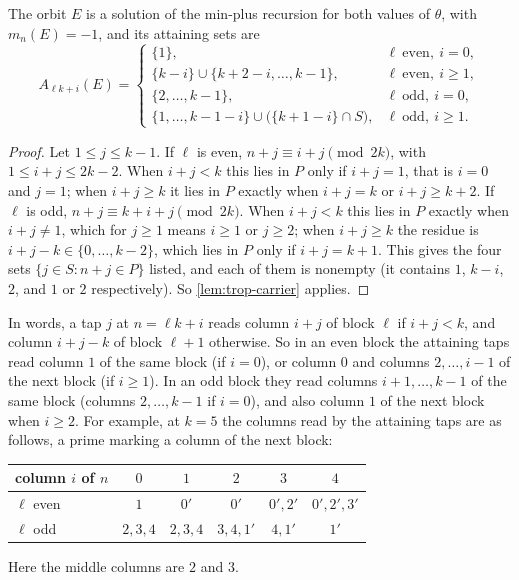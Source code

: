 \begin{lemma}
\label{lem:fs-carrier}
The orbit $E$ is a solution of the min-plus recursion for both values of $\theta$,
with $m_n(E)=-1$, and its attaining sets are
\[
A_{\ell k+i}(E)=\begin{cases}
\{1\}, & \ell\ \text{even},\ i=0,\\
\{k-i\}\cup\{k+2-i,\dots,k-1\}, & \ell\ \text{even},\ i\ge1,\\
\{2,\dots,k-1\}, & \ell\ \text{odd},\ i=0,\\
\{1,\dots,k-1-i\}\cup\bigl(\{k+1-i\}\cap S\bigr), & \ell\ \text{odd},\ i\ge1.
\end{cases}
\]
\end{lemma}

\begin{proof}
Let $1\le j\le k-1$. If $\ell$ is even, $n+j\equiv i+j\pmod{2k}$, with
$1\le i+j\le2k-2$. When $i+j<k$ this lies in $P$ only if $i+j=1$, that is $i=0$
and $j=1$; when $i+j\ge k$ it lies in $P$ exactly when $i+j=k$ or $i+j\ge k+2$.
If $\ell$ is odd, $n+j\equiv k+i+j\pmod{2k}$. When $i+j<k$ this lies in $P$
exactly when $i+j\ne1$, which for $j\ge1$ means $i\ge1$ or $j\ge2$; when $i+j\ge k$
the residue is $i+j-k\in\{0,\dots,k-2\}$, which lies in $P$ only if $i+j=k+1$.
This gives the four sets $\{j\in S:n+j\in P\}$ listed, and each of them is nonempty
(it contains $1$, $k-i$, $2$, and $1$ or $2$ respectively). So
\autoref{lem:trop-carrier} applies.
\end{proof}

In words, a tap $j$ at $n=\ell k+i$ reads column $i+j$ of block $\ell$ if
$i+j<k$, and column $i+j-k$ of block $\ell+1$ otherwise. So in an even block the
attaining taps read column $1$ of the same block (if $i=0$), or column $0$ and
columns $2,\dots,i-1$ of the next block (if $i\ge1$). In an odd block they read
columns $i+1,\dots,k-1$ of the same block (columns $2,\dots,k-1$ if $i=0$), and
also column $1$ of the next block when $i\ge2$. For example, at $k=5$ the
columns read by the attaining taps are as follows, a prime marking a column of
the next block:
\begin{center}
\small
\begin{tabular}{l|ccccc}
column $i$ of $n$ & $0$ & $1$ & $2$ & $3$ & $4$\\\hline
$\ell$ even & $1$ & $0'$ & $0'$ & $0',2'$ & $0',2',3'$\\
$\ell$ odd & $2,3,4$ & $2,3,4$ & $3,4,1'$ & $4,1'$ & $1'$
\end{tabular}
\end{center}
Here the middle columns are $2$ and $3$.

